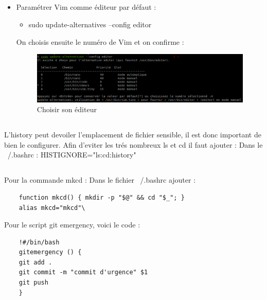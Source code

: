 \documentclass{article}
\begin{document}
\subsection{}
\begin{itemize}
    \item Paramétrer Vim comme éditeur par défaut :
    \begin{itemize}
        \item sudo update-alternatives --config editor
    \end{itemize}
    On choisis ensuite le numéro de Vim et on confirme :
    \begin{figure}
\centering
    \includegraphics[width=\textwidth]{screen/Exo1-3.png}
    \caption{\label{fig:frog}Choisir son éditeur}
\end{figure}
\end{itemize}
\subsection{}
L'history peut devoiler l'emplacement de fichier sensible, il est donc important de bien le configurer.
Afin d'eviter les trés nombreux ls et cd il faut ajouter :
Dans le ~/.bashrc : HISTIGNORE="ls:cd:history"\\

\subsection{}
Pour la commande mkcd :
Dans le fichier ~/.bashrc ajouter :
\begin{lstlisting}
    function mkcd() { mkdir -p "$@" && cd "$_"; }
    alias mkcd="mkcd"\
\end{lstlisting}
Pour le script git emergency, voici le code :
\begin{lstlisting}
    !#/bin/bash
    gitemergency () {
	git add .
	git commit -m "commit d'urgence" $1
	git push
    }
    \end{lstlisting}
\end{document}
